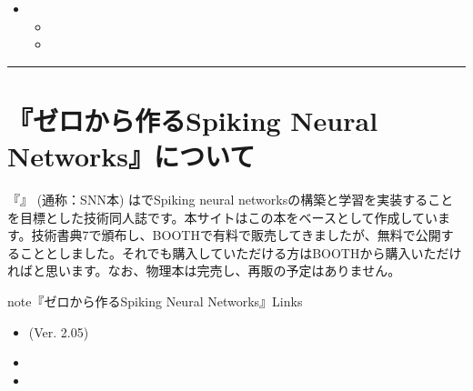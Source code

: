 \documentclass[letterpaper,10pt,english]{sphinxmanual}
\begin{document}
\begin{itemize}
\item {} 
\begin{itemize}
\item {} 

\item {} 

\end{itemize}

\end{itemize}


\bigskip\hrule\bigskip



\chapter{『ゼロから作るSpiking Neural Networks』について}
\label{\detokenize{index:spiking-neural-networks}}
『』 (通称：SNN本) はでSpiking neural networksの構築と学習を実装することを目標とした技術同人誌です。本サイトはこの本をベースとして作成しています。技術書典7で頒布し、BOOTHで有料で販売してきましたが、無料で公開することとしました。それでも購入していただける方はBOOTHから購入いただければと思います。なお、物理本は完売し、再販の予定はありません。

\begin{sphinxadmonition}{note}{『ゼロから作るSpiking Neural Networks』Links}
\begin{itemize}
\item {} 
 (Ver. 2.05)

\item {} 

\item {} 

\end{itemize}
\end{sphinxadmonition}
\end{document}
